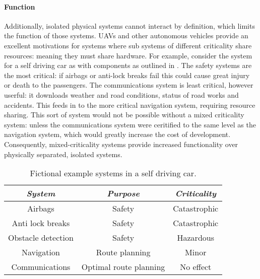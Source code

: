 \paragraph{Function}

Additionally, isolated physical systems cannot interact by definition, which limits the function of those systems. 
\glspl{UAV} and other autonomous vehicles provide an excellent motivations for systems where sub systems of different criticality share resources: meaning they must share hardware.
For example, consider the system for a self driving car as with components as outlined in .
The safety systems are the most critical: if airbags or anti-lock breaks fail this could cause great injury or death to the passengers.
The communications system is least critical, however userful: it downloads weather and road conditions, status of road works and accidents. 
This feeds in to the more critical navigation system, requiring resource sharing.
This sort of system would not be possible without a mixed criticality system: unless the communications system were ceritified to the same level as the navigation system, which would greatly increase the cost of development. 
Consequently, mixed-criticality systems provide increased functionality over physically separated, isolated systems.

\begin{table} 
\centering
\begin{tabular}{ccc}\toprule
    \emph{System}     & \emph{Purpose} & \emph{Criticality} \\\midrule
     Airbags            & Safety &  Catastrophic \\
     Anti lock breaks   & Safety &  Catastrophic \\
     Obstacle detection & Safety &  Hazardous    \\
     Navigation         & Route planning & Minor \\  
     Communications     & Optimal route planning & No effect \\
    \bottomrule
\end{tabular}
\caption{Fictional example systems in a self driving car.}
\label{tab:self-driving-car}
\end{table}



